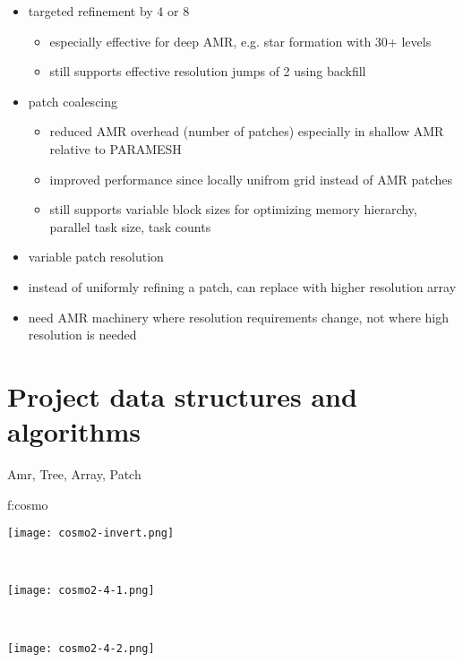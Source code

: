 \documentclass[14pt,letter]{article}
\begin{document}
\begin{itemize}
\item targeted refinement by 4 or 8
  \begin{itemize}
  \item especially effective for deep AMR, e.g. star formation with
    30+ levels
  \item still supports effective resolution jumps of 2 using backfill
  \end{itemize}
\item patch coalescing
  \begin{itemize}
  \item reduced AMR overhead (number of patches) especially in shallow
    AMR relative to PARAMESH
  \item improved performance since locally unifrom grid instead of AMR
    patches
  \item still supports variable block sizes for optimizing memory
    hierarchy, parallel task size, task counts
  \end{itemize}
\item variable patch resolution
\item instead of uniformly refining a patch, can replace with higher
  resolution array
\item need AMR machinery where resolution requirements change, not
  where high resolution is needed
\end{itemize}


\section{Project data structures and algorithms}

Amr, Tree, Array, Patch



{f:cosmo}{
\begin{minipage}{7.0in}
\begin{minipage}{2.2in}
\texttt{[image: cosmo2-invert.png]}
\end{minipage} \ 
\begin{minipage}{2.2in}
\texttt{[image: cosmo2-4-1.png]}
\end{minipage} \ 
\begin{minipage}{2.2in}
\texttt{[image: cosmo2-4-2.png]}
\end{minipage}
\end{minipage}
}
\end{document}
